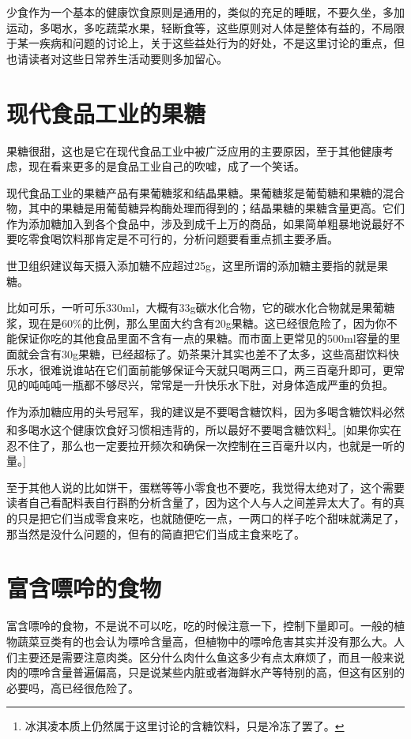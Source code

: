 \documentclass[12pt,oneside]{book}
\begin{document}
少食作为一个基本的健康饮食原则是通用的，类似的充足的睡眠，不要久坐，多加运动，多喝水，多吃蔬菜水果，轻断食等，这些原则对人体是整体有益的，不局限于某一疾病和问题的讨论上，关于这些益处行为的好处，不是这里讨论的重点，但也请读者对这些日常养生活动要则多加留心。


\section{现代食品工业的果糖}
果糖很甜，这也是它在现代食品工业中被广泛应用的主要原因，至于其他健康考虑，现在看来更多的是食品工业自己的吹嘘，成了一个笑话。

现代食品工业的果糖产品有果葡糖浆和结晶果糖。果葡糖浆是葡萄糖和果糖的混合物，其中的果糖是用葡萄糖异构酶处理而得到的；结晶果糖的果糖含量更高。它们作为添加糖加入到各个食品中，涉及到成千上万的商品，如果简单粗暴地说最好不要吃零食喝饮料那肯定是不可行的，分析问题要看重点抓主要矛盾。

世卫组织建议每天摄入添加糖不应超过25g，这里所谓的添加糖主要指的就是果糖。

比如可乐，一听可乐330ml，大概有33g碳水化合物，它的碳水化合物就是果葡糖浆，现在是60\%的比例，那么里面大约含有20g果糖。这已经很危险了，因为你不能保证你吃的其他食品里面不含有一点的果糖。而市面上更常见的500ml容量的里面就会含有30g果糖，已经超标了。奶茶果汁其实也差不了太多，这些高甜饮料快乐水，很难说谁站在它们面前能够保证今天就只喝两三口，两三百毫升即可，更常见的吨吨吨一瓶都不够尽兴，常常是一升快乐水下肚，对身体造成严重的负担。

作为添加糖应用的头号冠军，我的建议是不要喝含糖饮料，因为多喝含糖饮料必然和多喝水这个健康饮食好习惯相违背的，所以最好不要喝含糖饮料\footnote{冰淇凌本质上仍然属于这里讨论的含糖饮料，只是冷冻了罢了。}。[如果你实在忍不住了，那么也一定要拉开频次和确保一次控制在三百毫升以内，也就是一听的量。]

至于其他人说的比如饼干，蛋糕等等小零食也不要吃，我觉得太绝对了，这个需要读者自己看配料表自行斟酌分析含量了，因为这个人与人之间差异太大了。有的真的只是把它们当成零食来吃，也就随便吃一点，一两口的样子吃个甜味就满足了，那当然是没什么问题的，但有的简直把它们当成主食来吃了。



\section{富含嘌呤的食物}
富含嘌呤的食物，不是说不可以吃，吃的时候注意一下，控制下量即可。一般的植物蔬菜豆类有的也会认为嘌呤含量高，但植物中的嘌呤危害其实并没有那么大。人们主要还是需要注意肉类。区分什么肉什么鱼这多少有点太麻烦了，而且一般来说肉的嘌呤含量普遍偏高，只是说某些内脏或者海鲜水产等特别的高，但这有区别的必要吗，高已经很危险了。
\end{document}
